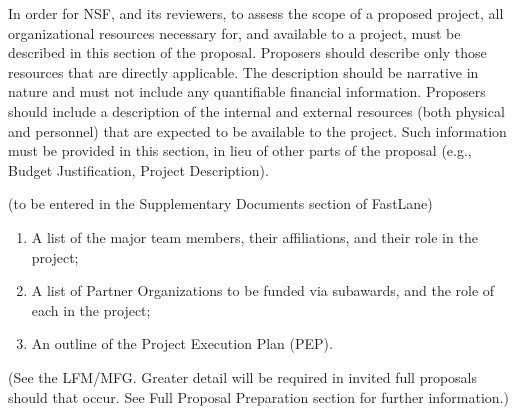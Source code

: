 \documentclass[oneside,11pt]{amsart}
\begin{document}
\newpage


In order for NSF, and its reviewers, to assess the scope of a proposed
project, all organizational resources necessary for, and available to a
project, must be described in this section of the proposal. Proposers
should describe only those resources that are directly applicable. The
description should be narrative in nature and must not include any
quantifiable financial information. Proposers should include a
description of the internal and external resources (both physical and
personnel) that are expected to be available to the project.  Such
information must be provided in this section, in lieu of other parts of
the proposal (e.g., Budget Justification, Project Description).

\newpage


(to be entered in the Supplementary Documents section of FastLane)

\begin{enumerate}
%
\item A list of the major team members, their affiliations, and their
role in the project;
%
\item A list of Partner Organizations to be funded via subawards, and
the role of each in the project;
%
\item An outline of the Project Execution Plan (PEP).
\end{enumerate}

(See the LFM/MFG. Greater detail will be required in invited full
proposals should that occur. See Full Proposal Preparation section for
further information.)
\end{document}
